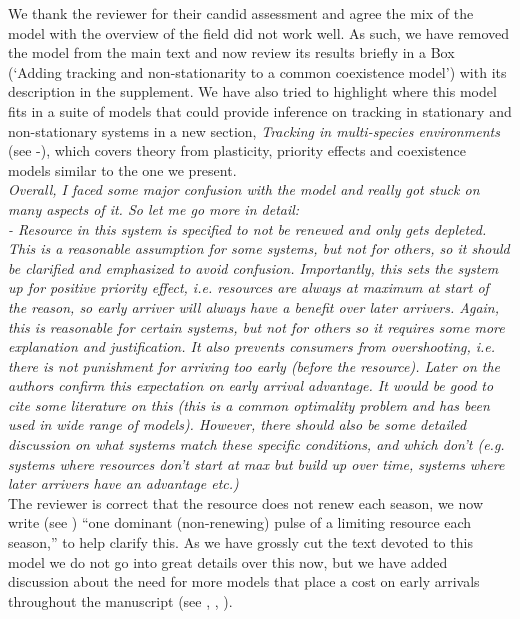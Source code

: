 \documentclass[11pt]{article}
\begin{document}
We thank the reviewer for their candid assessment and agree the mix of the model with the overview of the field did not work well. As such, we have removed the model from the main text and now review its results briefly in a Box (`Adding tracking and non-stationarity to a common coexistence model') with its description in the supplement. We have also tried to highlight where this model fits in a suite of models that could provide inference on tracking in stationary and non-stationary systems in a new section, \emph{Tracking in multi-species environments} (see -), which covers theory from plasticity, priority effects and coexistence models similar to the one we present.  \\


\emph{Overall, I faced some major confusion with the model and really got stuck on many aspects of
it. So let me go more in detail:\\
-       Resource in this system is specified to not be renewed and only gets depleted. This
is a reasonable assumption for some systems, but not for others, so it should be clarified
and emphasized to avoid confusion. Importantly, this sets the system up for positive priority
effect, i.e. resources are always at maximum at start of the reason, so early arriver will
always have a benefit over later arrivers. Again, this is reasonable for certain systems, but
not for others so it requires some more explanation and justification. It also prevents
consumers from overshooting, i.e. there is not punishment for arriving too early (before the
resource). Later on the authors confirm this expectation on early arrival advantage. It would
be good to cite some literature on this (this is a common optimality problem and has been
used in wide range of models). However, there should also be some detailed discussion on what
systems match these specific conditions, and which don't (e.g. systems where resources don't
start at max but build up over time, systems where later arrivers have an advantage etc.)}\\

The reviewer is correct that the resource does not renew each season, we now write (see ) ``one dominant (non-renewing) pulse of a limiting resource each season,'' to help clarify this. As we have grossly cut the text devoted to this model we do not go into great details over this now, but we have added discussion about the need for more models that place a cost on early arrivals throughout the manuscript (see , , ). \\
\end{document}

